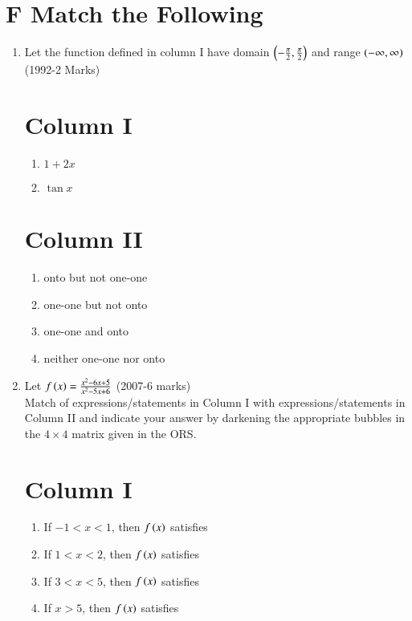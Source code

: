 \documentclass[journal,12pt,onecolumn,article]{IEEEtran}
\theoremstyle{remark}
\begin{document}
	\section*{F Match the Following}
	\begin{enumerate}
		\item Let the function defined in column I have domain $\left(-\frac{\pi}{2},\frac{\pi}{2}\right)$ and range $\left(-\infty,\infty\right)$ \hfill(1992-2 Marks)
			\begin{multicols}{2} 
				\section*{Column I}
				\begin{enumerate}[label=(\Alph*)]
					\item $1+2x$
					\item $\tan x$
				\end{enumerate}
				\columnbreak
				 \section*{Column II}
				\begin{enumerate}[label=(\alph*),start=16]
					\item onto but not one-one
					\item one-one but not onto
					\item one-one and onto
					\item neither one-one nor onto
				\end{enumerate}
			\end{multicols}
		\item Let $f\left(x\right)=\frac{x^2-6x+5}{x^2-5x+6}$ \hfill(2007-6 marks)
					\\ Match of expressions/statements in Column I with expressions/statements in Column II and indicate your answer by darkening the appropriate bubbles in the $4\times4$ matrix given in the ORS.
	
			              \begin{multicols}{2}
					      \section*{ Column I}
						\begin{enumerate}[label=(\Alph*)]
							\item If $-1<x<1$, then $f\left(x\right)$ satisfies
							\item If $1<x<2$, then $f\left(x\right)$ satisfies
							\item If $3<x<5$, then $f\left(x\right)$ satisfies
 							\item If $x>5$, then $f\left(x\right)$ satisfies
						\end{enumerate}
						\columnbreak

\end{multicols}
\end{enumerate}
\end{document}
